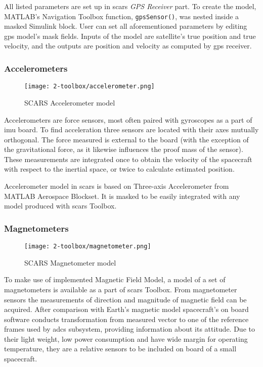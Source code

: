         All listed parameters are set up in \ac{scars} \textit{GPS Receiver} part. To create the model, MATLAB's Navigation Toolbox function, \verb|gpsSensor()|, was nested inside a masked Simulink block. User can set all aforementioned parameters by editing \ac{gps} model's mask fields. Inputs of the model are satellite's true position and true velocity, and the outputs are position and velocity as computed by \ac{gps} receiver.


    \subsubsection{Accelerometers}
        \begin{figure}[H]
            \centering
            \texttt{[image: 2-toolbox/accelerometer.png]}
            \caption{SCARS Accelerometer model}
            \label{fig:accelerometer}
        \end{figure}
        Accelerometers are force sensors, most often paired with gyroscopes as a part of \ac{imu} board. To find acceleration three sensors are located with their axes mutually orthogonal. The force measured is external to the board (with the exception of the gravitational force, as it likewise influences the proof mass of the sensor). These measurements are integrated once to obtain the velocity of the spacecraft with respect to the inertial space, or twice to calculate estimated position.

        Accelerometer model in \ac{scars} is based on Three-axis Accelerometer from MATLAB Aerospace Blockset. It is masked to be easily integrated with any model produced with \ac{scars} Toolbox.



    \subsubsection{Magnetometers}
        \begin{figure}[H]
            \centering
            \texttt{[image: 2-toolbox/magnetometer.png]}
            \caption{SCARS Magnetometer model}
            \label{fig:magnetometer}
        \end{figure}

        To make use of implemented Magnetic Field Model, a model of a set of magnetometers is available as a part of \ac{scars} Toolbox. From magnetometer sensors the measurements of direction and magnitude of magnetic field can be acquired. After comparison with Earth's magnetic model spacecraft's on board software conducts transformation from measured vector to one of the reference frames used by \ac{adcs} subsystem, providing information about its attitude. Due to their light weight, low power consumption and have wide margin for operating temperature, they are a relative sensors to be included on board of a small spacecraft.

